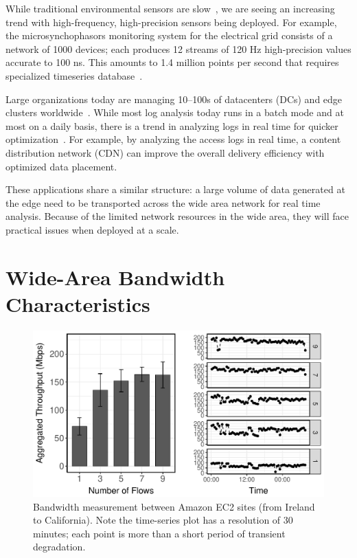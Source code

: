 While traditional environmental sensors are
slow~\cite{atzori2010internet}, we are seeing an increasing trend with
high-frequency, high-precision sensors being deployed. For example, the
microsynchophasors monitoring system for the electrical grid consists of a
network of 1000 devices; each produces 12 streams of 120 Hz high-precision
values accurate to 100 ns. This amounts to 1.4 million points per second that
requires specialized timeseries database~\cite{andersen2016btrdb}.

 Large organizations today are managing 10--100s of
datacenters (DCs) and edge clusters worldwide~\cite{calder2013mapping}. While
most log analysis today runs in a batch mode and at most on a daily basis, there
is a trend in analyzing logs in real time for quicker
optimization~\cite{alspaugh2014analyzing}. For example, by analyzing the access
logs in real time, a content distribution network (CDN) can improve the overall
delivery efficiency with optimized data placement.

\vspace{0.5em}

These applications share a similar structure: a large volume of data generated
at the edge need to be transported across the wide area network for real time
analysis. Because of the limited network resources in the wide area, they will
face practical issues when deployed at a scale.

\section{Wide-Area Bandwidth Characteristics}
\label{sec:making-case-adapt}

\begin{figure}
  \centering
  \includegraphics[width=.95\linewidth]{figures/europe-to-us-west.pdf}
  \caption{Bandwidth measurement between Amazon EC2 sites (from Ireland to
    California). Note the time-series plot has a resolution of 30 minutes; each
    point is more than a short period of transient degradation.}
  \label{fig:bw}
\end{figure}

